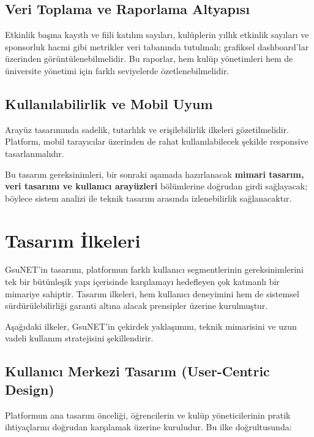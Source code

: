 \documentclass[a4paper,12pt]{report}
\begin{document}
\subsection{Veri Toplama ve Raporlama Altyapısı}

Etkinlik başına kayıtlı ve fiili katılım sayıları, kulüplerin yıllık etkinlik sayıları ve sponsorluk hacmi gibi metrikler veri tabanında tutulmalı; grafiksel dashboard'lar üzerinden görüntülenebilmelidir. Bu raporlar, hem kulüp yönetimleri hem de üniversite yönetimi için farklı seviyelerde özetlenebilmelidir.

\subsection{Kullanılabilirlik ve Mobil Uyum}

Arayüz tasarımında sadelik, tutarlılık ve erişilebilirlik ilkeleri gözetilmelidir. Platform, mobil tarayıcılar üzerinden de rahat kullanılabilecek şekilde responsive tasarlanmalıdır.

\bigskip

Bu tasarım gereksinimleri, bir sonraki aşamada hazırlanacak \textbf{mimari tasarım, veri tasarımı ve kullanıcı arayüzleri} bölümlerine doğrudan girdi sağlayacak; böylece sistem analizi ile teknik tasarım arasında izlenebilirlik sağlanacaktır.

\section{Tasarım İlkeleri}

GsuNET’in tasarımı, platformun farklı kullanıcı segmentlerinin gereksinimlerini tek bir bütünleşik yapı içerisinde karşılamayı hedefleyen çok katmanlı bir mimariye sahiptir. Tasarım ilkeleri, hem kullanıcı deneyimini hem de sistemsel sürdürülebilirliği garanti altına alacak prensipler üzerine kurulmuştur.

Aşağıdaki ilkeler, GsuNET’in çekirdek yaklaşımını, teknik mimarisini ve uzun vadeli kullanım stratejisini şekillendirir.

\subsection{Kullanıcı Merkezi Tasarım (User-Centric Design)}

Platformun ana tasarım önceliği, öğrencilerin ve kulüp yöneticilerinin pratik ihtiyaçlarını doğrudan karşılamak üzerine kuruludur. Bu ilke doğrultusunda:
\end{document}

